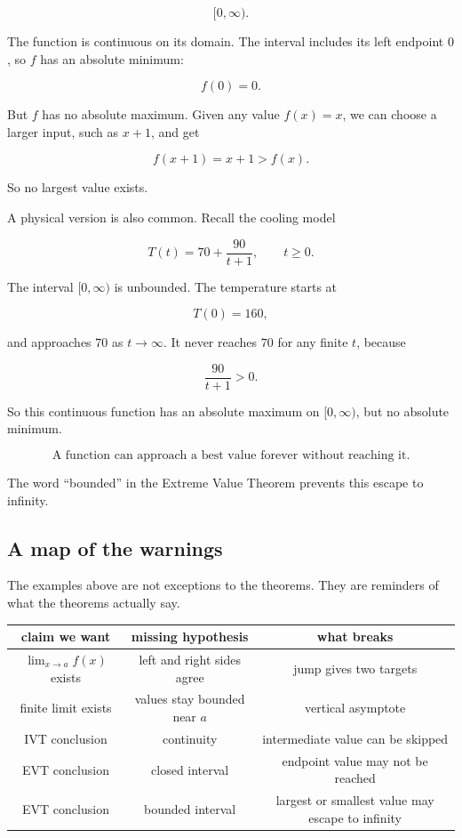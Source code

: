 \[
[0,\infty).
\]

The function is continuous on its domain.  The interval includes its left endpoint \(0\), so \(f\) has an absolute minimum:

\[
f(0)=0.
\]

But \(f\) has no absolute maximum.  Given any value \(f(x)=x\), we can choose a larger input, such as \(x+1\), and get

\[
f(x+1)=x+1>f(x).
\]

So no largest value exists.

A physical version is also common.  Recall the cooling model

\[
T(t)=70+\frac{90}{t+1},
\qquad t\ge0.
\]

The interval \([0,\infty)\) is unbounded.  The temperature starts at

\[
T(0)=160,
\]

and approaches \(70\) as \(t\to\infty\).  It never reaches \(70\) for any finite \(t\), because

\[
\frac{90}{t+1}>0.
\]

So this continuous function has an absolute maximum on \([0,\infty)\), but no absolute minimum.

\[
\boxed{\text{A function can approach a best value forever without reaching it.}}
\]

The word ``bounded'' in the Extreme Value Theorem prevents this escape to infinity.

\subsection{A map of the warnings}
\label{subsec:map-of-warnings}

The examples above are not exceptions to the theorems.  They are reminders of what the theorems actually say.

\begin{center}
\begin{tabular}{c|c|c}
\textbf{claim we want} & \textbf{missing hypothesis} & \textbf{what breaks} \\ \hline
\(\lim_{x\to a}f(x)\) exists &
left and right sides agree &
jump gives two targets \\[3pt]
finite limit exists &
values stay bounded near \(a\) &
vertical asymptote \\[3pt]
IVT conclusion &
continuity &
intermediate value can be skipped \\[3pt]
EVT conclusion &
closed interval &
endpoint value may not be reached \\[3pt]
EVT conclusion &
bounded interval &
largest or smallest value may escape to infinity
\end{tabular}
\end{center}

